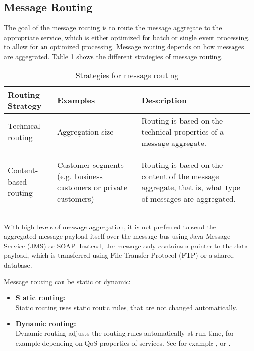 \subsection{Message Routing}
\label{sec:ch05_router}

The goal of the message routing is to route the message aggregate to the appropriate service, which is either optimized for batch or single event processing, to allow for an optimized processing. Message routing depends on how messages are aggegrated. Table \ref{table:ch05_message_routing} shows the different strategies of message routing.

\begin{table}[htbp]
	\centering
	\begin{tabularx}{\textwidth}{@{} p{3cm} X X @{}}
		\caption{Strategies for message routing}\label{table:ch05_message_routing}\\
		\toprule
		\bfseries Routing Strategy & \bfseries Examples & \bfseries Description\\
		\midrule
		Technical routing & \savespace
		\begin{titemize}
			\item Aggregation size
		\end{titemize} & Routing is based on the technical properties of a message aggregate.\\
		\midrule
		Content-based routing & \savespace
		\begin{titemize}
			\item Customer segments (e.g. business customers or private customers)
		\end{titemize} & Routing is based on the content of the message aggregate, that is, what type of messages are aggregated.\\
		\bottomrule
	\end{tabularx}
\end{table}

With high levels of message aggregation, it is not preferred to send the aggregated message payload itself over the message bus using Java Message Service (JMS) or SOAP. Instead, the message only contains a pointer to the data payload, which is transferred using File Transfer Protocol (FTP) or a shared database.

Message routing can be static or dynamic:
\begin{itemize}
	\item \textbf{Static routing:}\\ 
	Static routing uses static routic rules, that are not changed automatically.
	\item \textbf{Dynamic routing:}\\
	Dynamic routing adjusts the routing rules automatically at run-time, for example depending on \ac{QoS} properties of services. See for example \cite{Bai:2007aa}, \cite{Wu:2008aa} or \cite{Ziyaeva:2008aa}.
\end{itemize}

